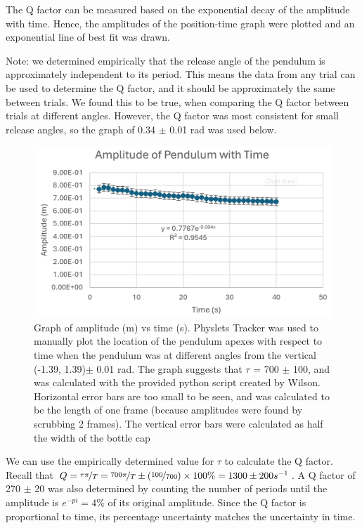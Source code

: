 \documentclass[notitlepage,twocolumn, 12pt]{report}
\begin{document}
    The Q factor can be measured based on the exponential decay of the amplitude with time. Hence, the amplitudes of the position-time graph were plotted and an exponential line of best fit was drawn. 

    Note: we determined empirically that the release angle of the pendulum is approximately independent to its period. This means the data from any trial can be used to determine the Q factor, and it should be approximately the same between trials. We found this to be true, when comparing the Q factor between trials at different angles. However, the Q factor was most consistent for small release angles, so the graph of 0.34 $\pm$ 0.01 rad was used below. 

    \begin{figure}[H]
        \includegraphics[width=\linewidth]{amplitudeTgraph.png}
        \caption{Graph of amplitude (m) vs time (s). Physlets Tracker was used to manually plot the location of the pendulum apexes with respect to time when the pendulum was at different angles from the vertical (-1.39, 1.39)$\pm$ 0.01 rad. The graph suggests that $\tau$ = 700 $\pm$ 100, and was calculated with the provided python script created by Wilson. Horizontal error bars are too small to be seen, and was calculated to be the length of one frame (because amplitudes were found by scrubbing 2 frames). The vertical error bars were calculated as half the width of the bottle cap}
    \end{figure}

    We can use the empirically determined value for $\tau$ to calculate the Q factor. Recall that $Q = \nicefrac{\tau \pi}{T} = \nicefrac{700\pi}{T} \pm (\nicefrac{100}{700})\times 100\% = 1300 \pm 200 s^{-1}$. A Q factor of 270 $\pm$ 20 was also determined by counting the number of periods until the amplitude is $e^{-pi}=4\%$ of its original amplitude. Since the Q factor is proportional to time, its percentage uncertainty matches the uncertainty in time.
    
\end{document}
